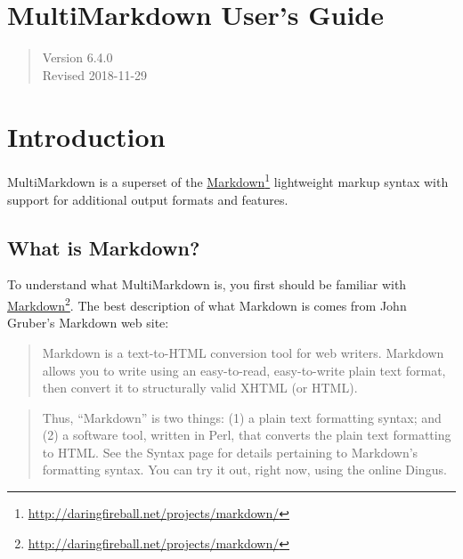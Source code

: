 
\def\mytitle{MultiMarkdown User's Guide}
\def\latextitle{MultiMarkdown \\ User's Guide}
\def\myauthor{Fletcher T. Penney}
\def\version{6.4.0}
\def\revised{2018-11-29}
\def\uuid{88e8f53c-9a02-4e49-a639-f2dbb0a2e338}




\chapter{MultiMarkdown User's Guide}
\label{title}

\begin{quote}
Version 6.4.0\\
Revised 2018-11-29
\end{quote}


\chapter{Introduction}
\label{introduction}

MultiMarkdown is a superset of the \href{http://daringfireball.net/projects/markdown/}{Markdown}\footnote{\href{http://daringfireball.net/projects/markdown/}{http:\slash{}\slash{}daringfireball.net\slash{}projects\slash{}markdown\slash{}}} lightweight markup syntax with support for additional output formats and features.

\section{What is Markdown?}
\label{whatismarkdown}

To understand what MultiMarkdown is, you first should be familiar with
\href{http://daringfireball.net/projects/markdown/}{Markdown}\footnote{\href{http://daringfireball.net/projects/markdown/}{http:\slash{}\slash{}daringfireball.net\slash{}projects\slash{}markdown\slash{}}}. The best description of what Markdown is comes from John Gruber's
Markdown web site:

\begin{quote}
Markdown is a text-to-HTML conversion tool for web writers. Markdown
allows you to write using an easy-to-read, easy-to-write plain text
format, then convert it to structurally valid XHTML (or HTML).
\end{quote}

\begin{quote}
Thus, ``Markdown'' is two things: (1) a plain text formatting
syntax; and (2) a software tool, written in Perl, that converts
the plain text formatting to HTML. See the Syntax page for details
pertaining to Markdown's formatting syntax. You can try it out,
right now, using the online Dingus.
\end{quote}


